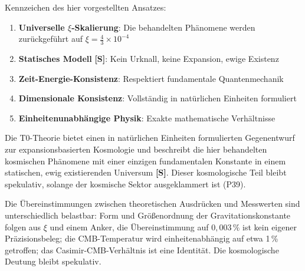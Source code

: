 	Kennzeichen des hier vorgestellten Ansatzes:
	\begin{enumerate}
		\item \textbf{Universelle $\xi$-Skalierung}: Die behandelten Phänomene werden zurückgeführt auf $\xi = \frac{4}{3} \times 10^{-4}$
		\item \textbf{Statisches Modell} \textbf{[S]}: Kein Urknall, keine Expansion, ewige Existenz
		\item \textbf{Zeit-Energie-Konsistenz}: Respektiert fundamentale Quantenmechanik
		\item \textbf{Dimensionale Konsistenz}: Vollständig in natürlichen Einheiten formuliert
		\item \textbf{Einheitenunabhängige Physik}: Exakte mathematische Verhältnisse
	\end{enumerate}
	
	\begin{revolutionary}[Fazit]
		Die T0-Theorie bietet einen in natürlichen Einheiten formulierten Gegenentwurf zur expansionsbasierten Kosmologie und beschreibt die hier behandelten kosmischen Phänomene mit einer einzigen fundamentalen Konstante in einem statischen, ewig existierenden Universum \textbf{[S]}. Dieser kosmologische Teil bleibt spekulativ, solange der kosmische Sektor ausgeklammert ist (P39).
	\end{revolutionary}
	
	Die Übereinstimmungen zwischen theoretischen Ausdrücken und Messwerten sind unterschiedlich belastbar: Form und Größenordnung der Gravitationskonstante folgen aus $\xi$ und einem Anker, die Übereinstimmung auf $0{,}003\,\%$ ist kein eigener Präzisionsbeleg; die CMB-Temperatur wird einheitenabhängig auf etwa 1\,\% getroffen; das Casimir-CMB-Verhältnis ist eine Identität. Die kosmologische Deutung bleibt spekulativ.
	


